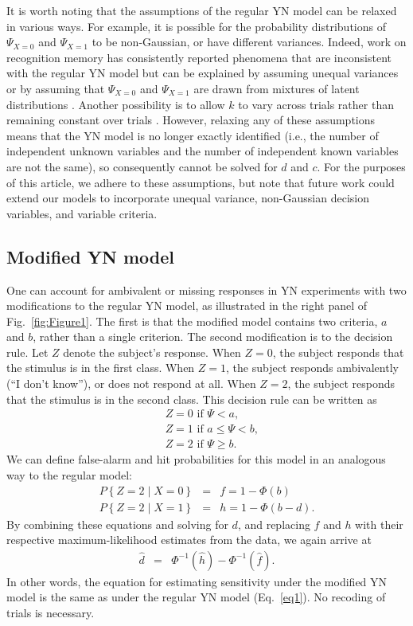 \documentclass[man]{apa6}
\begin{document}
It is worth noting that the assumptions of the regular YN model can be relaxed in various ways. For example, it is possible for the probability distributions of $\Psi_{X=0}$ and $\Psi_{X=1}$ to be non-Gaussian, or have different variances. Indeed, work on recognition memory has consistently reported phenomena that are inconsistent with the regular YN model but can be explained by assuming unequal variances \parencite{Wixted2007, Yonelinas2007} or by assuming that $\Psi_{X=0}$ and $\Psi_{X=1}$ are drawn from mixtures of latent distributions \parencite{decarlosignal2002}. Another possibility is to allow $k$ to vary across trials rather than remaining constant over trials \parencite{cabreraseparating2015}. However, relaxing any of these assumptions means that the YN model is no longer exactly identified (i.e., the number of independent unknown variables and the number of independent known variables are not the same), so consequently cannot be solved for $d$ and $c$. For the purposes of this article, we adhere to these assumptions, but note that future work could extend our models to incorporate unequal variance, non-Gaussian decision variables, and variable criteria.

\subsection{Modified YN model}
One can account for ambivalent or missing responses in YN experiments with two modifications to the regular YN model, as illustrated in the right panel of Fig.~\ref{fig:Figure1}. The first is that the modified model contains two criteria, $a$ and $b$, rather than a single criterion. The second modification is to the decision rule. Let $Z$ denote the subject's response. When $Z=0$, the subject responds that the stimulus is in the first class. When $Z=1$, the subject responds ambivalently (``I don't know''), or does not respond at all. When $Z=2$, the subject responds that the stimulus is in the second class. This decision rule can be written as
\begin{eqnarray*}
&Z=0\textrm{ if }\Psi<a\textrm{,}\\
&Z=1\textrm{ if }a\le\Psi<b\textrm{,}\\
&Z=2\textrm{ if }\Psi\ge{}b\textrm{.}
\end{eqnarray*} 
We can define false-alarm and hit probabilities for this model in an analogous way to the regular model:
\begin{eqnarray*}
P\left\{Z=2\mid{}X=0\right\}&=&f=1-\Phi\left(b\right)\\
P\left\{Z=2\mid{}X=1\right\}&=&h=1-\Phi\left(b-d\right)\textrm{.}
\end{eqnarray*}
By combining these equations and solving for $d$, and replacing $f$ and $h$ with their respective maximum-likelihood estimates from the data, we again arrive at
\begin{eqnarray*}
\hat{d}&=&\Phi^{-1}\left(\hat{h}\right)-\Phi^{-1}\left(\hat{f}\right)\textrm{.}
\end{eqnarray*}In other words, the equation for estimating sensitivity under the modified YN model is the same as under the regular YN model (Eq.~\ref{eq1}). No recoding of trials is necessary.
\end{document}
